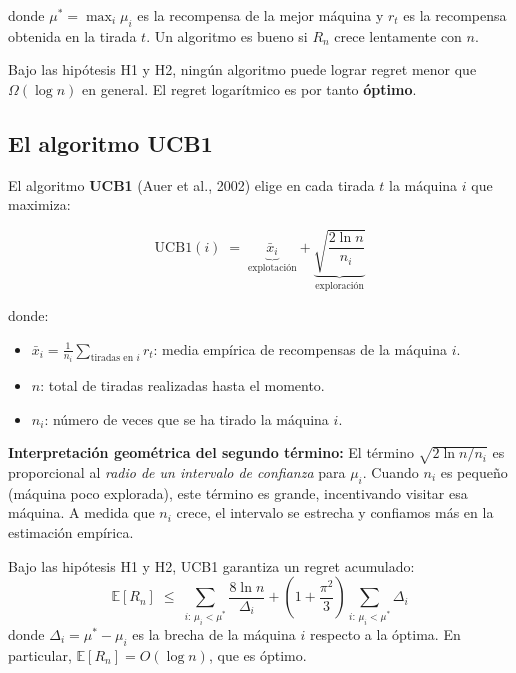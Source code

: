 \documentclass[12pt, a4paper]{article}
\begin{document}
donde $\mu^* = \max_i \mu_i$ es la recompensa de la mejor máquina y $r_t$ es
la recompensa obtenida en la tirada $t$. Un algoritmo es bueno si $R_n$ crece
lentamente con $n$.

\begin{tcolorbox}[teorema, title={Resultado fundamental (Lai \& Robbins, 1985)}]
Bajo las hipótesis H1 y H2, ningún algoritmo puede lograr regret menor que
$\Omega(\log n)$ en general. El regret logarítmico es por tanto \textbf{óptimo}.
\end{tcolorbox}

\subsection{El algoritmo UCB1}

El algoritmo \textbf{UCB1} (Auer et al., 2002) elige en cada tirada $t$ la
máquina $i$ que maximiza:

\begin{equation}
  \text{UCB1}(i) \;=\;
  \underbrace{\bar{x}_i}_{\text{explotación}}
  +
  \underbrace{\sqrt{\dfrac{2\ln n}{n_i}}}_{\text{exploración}}
\end{equation}

donde:
\begin{itemize}
  \item $\bar{x}_i = \frac{1}{n_i}\sum_{\text{tiradas en }i} r_t$: media
    empírica de recompensas de la máquina $i$.
  \item $n$: total de tiradas realizadas hasta el momento.
  \item $n_i$: número de veces que se ha tirado la máquina $i$.
\end{itemize}

\textbf{Interpretación geométrica del segundo término:}
El término $\sqrt{2\ln n / n_i}$ es proporcional al \emph{radio de un
intervalo de confianza} para $\mu_i$. Cuando $n_i$ es pequeño (máquina poco
explorada), este término es grande, incentivando visitar esa máquina. A medida
que $n_i$ crece, el intervalo se estrecha y confiamos más en la estimación
empírica.

\begin{tcolorbox}[teorema, title={Garantía de UCB1 (Auer et al., 2002)}]
Bajo las hipótesis H1 y H2, UCB1 garantiza un regret acumulado:
\[
  \mathbb{E}[R_n] \;\leq\; \sum_{i:\,\mu_i < \mu^*} \frac{8\ln n}{\Delta_i}
  + \left(1 + \frac{\pi^2}{3}\right)\sum_{i:\,\mu_i < \mu^*} \Delta_i
\]
donde $\Delta_i = \mu^* - \mu_i$ es la brecha de la máquina $i$ respecto a la
óptima. En particular, $\mathbb{E}[R_n] = O(\log n)$, que es óptimo.
\end{tcolorbox}
\end{document}
